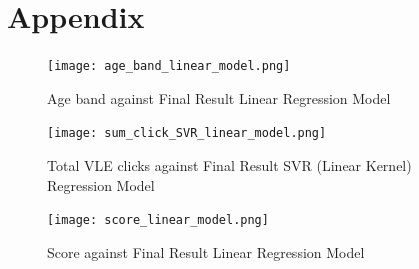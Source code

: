 \documentclass[11pt, a4paper, twocolumn]{article}
\begin{document}
\section*{Appendix}
\centering
\begin{figure}[H]
	\texttt{[image: age\_band\_linear\_model.png]} 
	\caption{Age band against Final Result Linear Regression Model}
	\label{fig:AgeLin}
\end{figure}
\centering
\begin{figure}[H]
	\texttt{[image: sum\_click\_SVR\_linear\_model.png]} 
	\caption{Total VLE clicks against Final Result SVR (Linear Kernel) Regression Model}
	\label{fig:clickSVRLin}
\end{figure}
\centering
\begin{figure}[H]
	\texttt{[image: score\_linear\_model.png]} 
	\caption{Score against Final Result Linear Regression Model}
	\label{fig:scoreLinear}
\end{figure}



	
\end{document}
